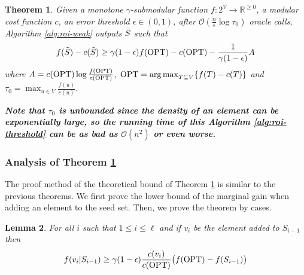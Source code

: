\documentclass[10pt]{article} %
\DeclareMathOperator*{\argmax}{arg\,max}
\newtheorem{theorem}{Theorem}
\newtheorem{lemma}[theorem]{Lemma}
\theoremstyle{remark}
\newcommand{\OPT}{{\rm OPT}}
\begin{document}
\begin{theorem}
\label{th:unconstrained-thresh}
    Given a monotone $\gamma$-submodular function $f:2^{V} \rightarrow \mathbb{R}^{\geq 0}$, a modular cost function $c$, an error threshold $\epsilon \in (0,1)$, after $\mathcal{O}(\frac{n}{\epsilon}\log \tau_0)$ oracle calls,  Algorithm \ref{alg:roi-weak} outputs $\Tilde{S}$ such that
    \[f(\Tilde{S})-c(\Tilde{S}) \geq \gamma(1-\epsilon) f(\OPT)-c(\OPT)- \frac{1}{\gamma(1-\epsilon)}A\]
    where $A = c(\OPT) \log \frac{f(\OPT)}{c(\OPT)}$, $\OPT =  \argmax_{T \subseteq V}\{f(T)-c(T)\}$ and $\tau_0 = \max_{u \in V}\frac{f(u)}{c(u)}$.
\end{theorem}

\textbf{\textit{Note that $\tau_0$ is unbounded since the density of an element can be exponentially large, so the running time of this Algorithm \ref{alg:roi-threshold} can be as bad as $\mathcal{O}(n^2)$ or even worse.}}



\subsubsection{Analysis of Theorem \ref{th:unconstrained-thresh}}
The proof method of the theoretical bound of Theorem \ref{th:unconstrained-thresh} is similar to the previous theorems. We first prove the lower bound of the marginal gain when adding an element to the seed set. Then, we prove the theorem by cases.

\begin{lemma}
\label{lem:marginal-gain-t}
For all $i$ such that $1 \leq i \leq \ell$ and if $v_i$ be the element added to $S_{i-1}$ then
\[ 
f(v_i|S_{i-1}) \geq \gamma(1-\epsilon) \frac{c(v_i)}{c(\OPT)} \big ( f(\OPT) - f(S_{i-1}) \big ) 
\]
\end{lemma}
\end{document}
